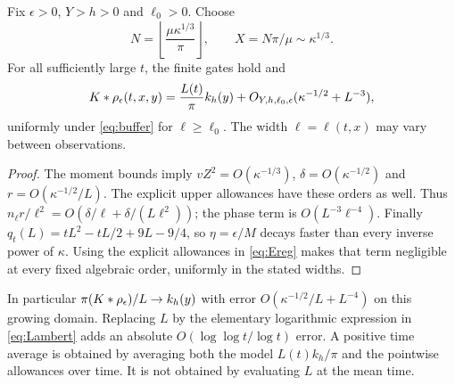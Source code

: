\begin{corollary}\label{cor:clock}
Fix $\epsilon>0$, $Y>h>0$ and $\ell_0>0$. Choose
\begin{equation}
 N=\left\lfloor\frac{\mu\kappa^{1/3}}{\pi}\right\rfloor,\qquad
 X=N\pi/\mu\sim\kappa^{1/3}.
 \label{eq:growing}
\end{equation}
For all sufficiently large $t$, the finite gates hold and
\begin{equation}
 K*\rho_\epsilon(t,x,y)=\frac{L(t)}{\pi}k_h(y)
       +O_{Y,h,\ell_0,\epsilon}(\kappa^{-1/2}+L^{-3}),
 \label{eq:clock}
\end{equation}
uniformly under \eqref{eq:buffer} for $\ell\ge\ell_0$.
The width $\ell=\ell(t,x)$ may vary between observations.
\end{corollary}
\begin{proof}
The moment bounds imply $vZ^2=O(\kappa^{-1/3})$,
$\delta=O(\kappa^{-1/2})$ and $r=O(\kappa^{-1/2}/L)$.
The explicit upper allowances have these orders as well.
Thus $n_\ell r/\ell^2=O(\delta/\ell+\delta/(L\ell^2))$;
the phase term is $O(L^{-3}\ell^{-4})$.
Finally
$q_t(L)=tL^2-tL/2+9L-9/4$, so $\eta=\epsilon/M$ decays faster
than every inverse power of $\kappa$.
Using the explicit allowances in \eqref{eq:Ereg} makes that term
negligible at every fixed algebraic order, uniformly in the stated widths.
\end{proof}
In particular $\pi(K*\rho_\epsilon)/L\to k_h(y)$ with error
$O(\kappa^{-1/2}/L+L^{-4})$ on this growing domain.
Replacing $L$ by the elementary logarithmic expression in
\eqref{eq:Lambert} adds an absolute
$O(\log\log t/\log t)$ error.
A positive time average is obtained by averaging both
the model $L(t)k_h/\pi$ and the pointwise allowances over time.
It is not obtained by evaluating $L$ at the mean time.
